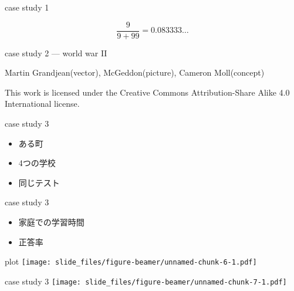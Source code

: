 \documentclass[
  ignorenonframetext,
]{beamer}
\begin{document}
\begin{frame}{case study 1}
\protect\hypertarget{case-study-1-5}{}
\begin{center}\Huge
\[
\frac{9}{9 + 99}=0.083333
\ldots
\]
\end{center}
\end{frame}

\begin{frame}{case study 2 --- world war II}
\protect\hypertarget{case-study-2-world-war-ii}{}
\raggedleft
{}

\tiny

\raggedleft

Martin Grandjean(vector), McGeddon(picture), Cameron Moll(concept)

\vspace{-5pt}

This work is licensed under the Creative Commons Attribution-Share Alike
4.0 International license.
\end{frame}

\begin{frame}{case study 3}
\protect\hypertarget{case-study-3}{}
\Huge

\begin{itemize}
\item[\textbullet] ある町
\pause
\item[\textbullet] 4つの学校
\pause
\item[\textbullet] 同じテスト
\end{itemize}
\end{frame}

\begin{frame}{case study 3}
\protect\hypertarget{case-study-3-1}{}
\Huge

\begin{itemize}
\item[\textbullet] 家庭での学習時間
\pause
\item[\textbullet] 正答率
\end{itemize}
\pause
\vspace*{-55pt}
\end{frame}

\begin{frame}{plot}
\protect\hypertarget{plot}{}
\texttt{[image: slide\_files/figure-beamer/unnamed-chunk-6-1.pdf]}
\end{frame}

\begin{frame}{case study 3}
\protect\hypertarget{case-study-3-2}{}
\texttt{[image: slide\_files/figure-beamer/unnamed-chunk-7-1.pdf]}
\end{frame}
\end{document}
